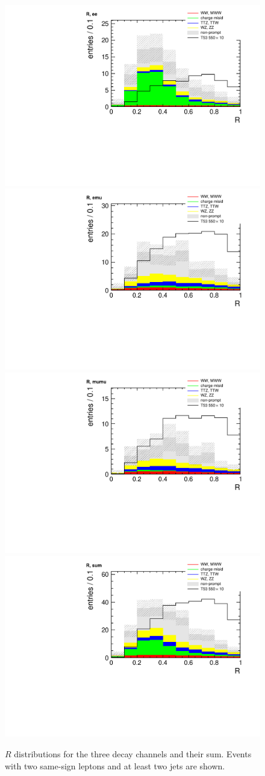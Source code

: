 \begin{figure}[htb]
    \centering
    \includegraphics[width=.7\textwidth]{images/pdf/r_ee_0}
    \includegraphics[width=.7\textwidth]{images/pdf/r_emu_0}
    \includegraphics[width=.7\textwidth]{images/pdf/r_mumu_0}
    \includegraphics[width=.7\textwidth]{images/pdf/r_sum_0}
    \caption{$R$ distributions for the three decay channels and their sum. Events with two same-sign leptons and at least
two jets are shown.}
    \label{fig:r_nobtag}
\end{figure}

